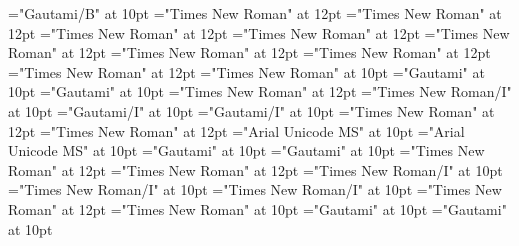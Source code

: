 \documentclass[a4paper,twoside]{article}
\begin{document}
\font\LexEntrypublishStemComponentTargetHeadWordRefaentryrefcomponentprimaryrefsentryletDatadicBody="Gautami/B" at 10pt
\font\aentryrefcomponentprimaryrefsentryletDatadicBody="Times New Roman" at 12pt
\font\entryrefcomponentprimaryrefsentryletDatadicBody="Times New Roman" at 12pt
\font\spanenspanenentryreftypeprimaryrefsentryletDatadicBody="Times New Roman" at 12pt
\font\spanenentryreftypeprimaryrefsentryletDatadicBody="Times New Roman" at 12pt
\font\entryreftypeprimaryrefsentryletDatadicBody="Times New Roman" at 12pt
\font\spanenprimaryrefsentryletDatadicBody="Times New Roman" at 12pt
\font\primaryrefsentryletDatadicBody="Times New Roman" at 12pt
\font\spanenexamplessensesensesentryletDatadicBody="Times New Roman" at 12pt
\font\spanentranslationLdtranslationsxitemexamplessensesensesentryletDatadicBody="Times New Roman" at 10pt
\font\spantetranslationLdtranslationsxitemexamplessensesensesentryletDatadicBody="Gautami" at 10pt
\font\translationLdtranslationsxitemexamplessensesensesentryletDatadicBody="Gautami" at 10pt
\font\translationsxitemexamplessensesensesentryletDatadicBody="Times New Roman" at 12pt
\font\spanenexamplexitemexamplessensesensesentryletDatadicBody="Times New Roman/I" at 10pt
\font\spanggoTeluINexamplexitemexamplessensesensesentryletDatadicBody="Gautami/I" at 10pt
\font\examplexitemexamplessensesensesentryletDatadicBody="Gautami/I" at 10pt
\font\xitemexamplessensesensesentryletDatadicBody="Times New Roman" at 12pt
\font\examplessensesensesentryletDatadicBody="Times New Roman" at 12pt
\font\spanhixitemhiLexSensepublishStemGlossPubLdsensesensesentryletDatadicBody="Arial Unicode MS" at 10pt
\font\xitemhiLexSensepublishStemGlossPubLdsensesensesentryletDatadicBody="Arial Unicode MS" at 10pt
\font\spantexitemteLexSensepublishStemGlossPubLdsensesensesentryletDatadicBody="Gautami" at 10pt
\font\xitemteLexSensepublishStemGlossPubLdsensesensesentryletDatadicBody="Gautami" at 10pt
\font\xsensenumberaftersensesensesentryletDatadicBody="Times New Roman" at 12pt
\font\xsensenumbersensesensesentryletDatadicBody="Times New Roman" at 12pt
\font\spanenspanengrammaticalinfoentryletDatadicBody="Times New Roman/I" at 10pt
\font\spanengrammaticalinfoentryletDatadicBody="Times New Roman/I" at 10pt
\font\grammaticalinfoentryletDatadicBody="Times New Roman/I" at 10pt
\font\spanensensesentryletDatadicBody="Times New Roman" at 12pt
\font\spanenLexSensepublishStemGlossPubLdsensesensesentryletDatadicBody="Times New Roman" at 10pt
\font\spanteLexSensepublishStemGlossPubLdsensesensesentryletDatadicBody="Gautami" at 10pt
\font\LexSensepublishStemGlossPubLdsensesensesentryletDatadicBody="Gautami" at 10pt
\end{document}
